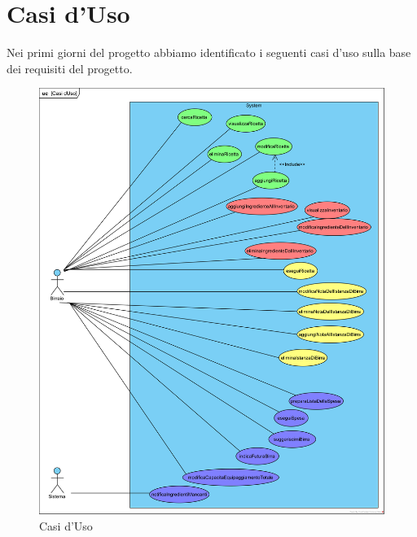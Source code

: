 \documentclass[a4paper,12pt]{report}
\begin{document}
	\section{Casi d'Uso}
	Nei primi giorni del progetto abbiamo identificato i seguenti casi d'uso sulla base dei requisiti del progetto. 
		\begin{figure}[!h]
			\centering
			\includegraphics[width=1\linewidth]{image/Casi-dUso.png}
			\caption{Casi d'Uso}\label{fig:Casi-d'Uso}
		\end{figure}
\end{document}
